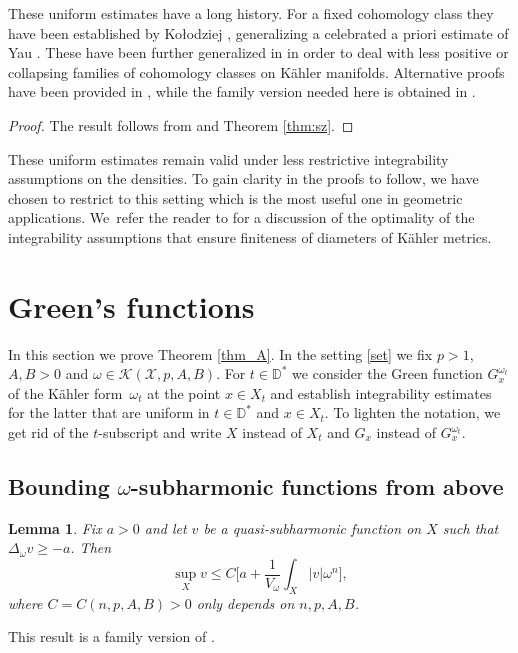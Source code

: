 \documentclass[10pt]{amsart}
\newtheorem{lem}[theorem]{Lemma}
\theoremstyle{definition}
\let\Subsection\subsection\let\Subsubsection\subsubsection
\begin{document}
These uniform estimates have a long history. For a fixed cohomology class they have been established by Ko{\l}odziej
\cite{Kol98}, generalizing a celebrated a priori estimate of Yau \cite{Yau78}.
These have been further generalized in \cite{EGZ09,EGZ08,DP10,BEGZ10} in order to deal with less positive or collapsing families of cohomology classes on Kähler manifolds. Alternative proofs have been provided in \cite{GL21,GPT23},
while the family version needed here is obtained in \cite{DnGG23}.

\begin{proof}
The result follows from \cite[Th.\,A]{DnGG23} and Theorem \ref{thm:sz}.
\end{proof}

These uniform estimates remain valid under less restrictive integrability assumptions on the densities.
To gain clarity in the proofs to follow, we have chosen to restrict to this setting which is the most useful one
in geometric applications. We~refer the reader to \cite[\S 5]{GGZ23} for a discussion of the optimality of the
integrability assumptions that ensure finiteness of diameters of Kähler metrics.

\section{Green's functions} \label{sec:uniformGreen}

In this section we prove Theorem \ref{thm_A}. In the setting \ref{set} we fix
$p>1$, $A,B>0$ and $\omega \in {\mathcal K}(\mathcal{X},p,A,B)$.
For $t \in {\mathbb D^*}$ we consider the Green function
$G^{\omega_t}_{x}$ of the Kähler form~$\omega_t$ at the point $x \in X_t$ and establish
integrability estimates for the latter that are uniform in $t \in {\mathbb D^*}$ and $x \in X_t$.
To lighten the notation, we get rid of the $t$-subscript and
write $X$ instead of $X_t$ and $G_x$ instead of $G^{\omega_t}_{x}$.

\Subsection{Bounding $\omega$-subharmonic functions from above}

\begin{lem} \label{lem:5.1}
Fix $a>0$ and let $v$ be a quasi-subharmonic function on $X$ such that $\Delta_{\omega} v \geq -a$.
Then\vspace*{-3pt}
\[
\sup_X v \leq C \biggl[ a+ \frac{1}{V_{\omega}} \int_X |v| \omega^n \biggr],
\]
where $C=C(n,p,A,B)>0$ only depends on $n,p,A,B$.
\end{lem}

This result is a family version of \cite[Lem.\,5.1]{GPSS22}.
\end{document}

